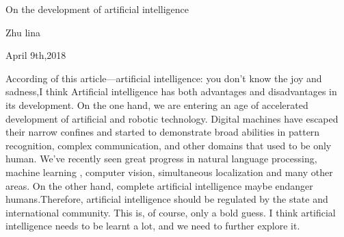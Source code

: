 \documentclass{article}
\begin{document}
                                     	\begin{center} 
                                   On the development of artificial intelligence\\  
                                        \end{center}               
                     
                                         \begin{center} 
                                         	Zhu lina\\
                                         	\end{center}
                                           \begin{center} 
                                             April 9th,2018\\
                                           \end{center}
         According of this article---artificial intelligence: you don't know the joy and sadness,I
         think  Artificial  intelligence  has  both  advantages  and  disadvantages  in its 
         development.  On  the  one  hand, we  are  entering  an age  of  accelerated  development
         of  artificial  and  robotic  technology.  Digital machines  have  escaped  their  narrow 
         confines  and  started  to  demonstrate broad  abilities  in  pattern recognition, complex
         communication,  and  other domains  that  used  to  be  only human. We've  recently  seen
         great progress  in  natural  language  processing,  machine learning ,  computer  vision,
         simultaneous  localization  and  many  other areas. On  the  other hand, complete
         artificial  intelligence  maybe  endanger  humans.Therefore,  artificial intelligence  should 
         be  regulated  by  the  state  and  international community.  This  is,  of course,  only  
         a  bold  guess. I  think  artificial  intelligence needs  to  be  learnt  a  lot,  and  we  
         need  to  further  explore  it.
\end{document}
